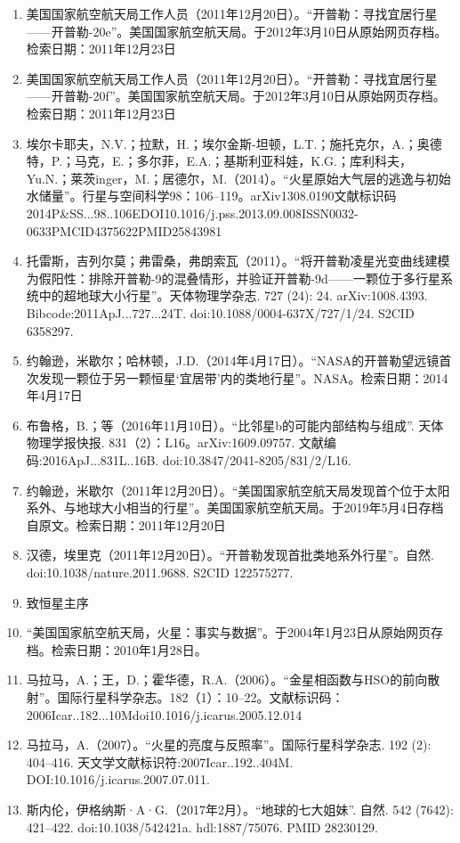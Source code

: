 \begin{enumerate}
\item 美国国家航空航天局工作人员（2011年12月20日）。“开普勒：寻找宜居行星——开普勒-20e”。美国国家航空航天局。于2012年3月10日从原始网页存档。检索日期：2011年12月23日
\item 美国国家航空航天局工作人员（2011年12月20日）。“开普勒：寻找宜居行星——开普勒-20f”。美国国家航空航天局。于2012年3月10日从原始网页存档。检索日期：2011年12月23日
\item 埃尔卡耶夫，N.V.；拉默，H.；埃尔金斯-坦顿，L.T.；施托克尔，A.；奥德特，P.；马克，E.；多尔菲，E.A.；基斯利亚科娃，K.G.；库利科夫，Yu.N.；莱茨inger，M.；居德尔，M.（2014）。“火星原始大气层的逃逸与初始水储量”。行星与空间科学98：106–119。arXiv1308.0190文献标识码2014P&SS...98..106EDOI10.1016/j.pss.2013.09.008ISSN0032-0633PMCID4375622PMID25843981
\item 托雷斯，吉列尔莫；弗雷桑，弗朗索瓦（2011）。“将开普勒凌星光变曲线建模为假阳性：排除开普勒-9的混叠情形，并验证开普勒-9d——一颗位于多行星系统中的超地球大小行星”。天体物理学杂志. 727 (24): 24. arXiv:1008.4393. Bibcode:2011ApJ...727...24T. doi:10.1088/0004-637X/727/1/24. S2CID 6358297.
\item 约翰逊，米歇尔；哈林顿，J.D.（2014年4月17日）。“NASA的开普勒望远镜首次发现一颗位于另一颗恒星‘宜居带’内的类地行星”。NASA。检索日期：2014年4月17日
\item 布鲁格，B.；等（2016年11月10日）。“比邻星b的可能内部结构与组成”. 天体物理学报快报. 831（2）：L16。arXiv:1609.09757. 文献编码:2016ApJ...831L..16B. doi:10.3847/2041-8205/831/2/L16.
\item 约翰逊，米歇尔（2011年12月20日）。“美国国家航空航天局发现首个位于太阳系外、与地球大小相当的行星”。美国国家航空航天局。于2019年5月4日存档自原文。检索日期：2011年12月20日
\item 汉德，埃里克（2011年12月20日）。“开普勒发现首批类地系外行星”。自然. doi:10.1038/nature.2011.9688. S2CID 122575277.
\item 致恒星主序
\item “美国国家航空航天局，火星：事实与数据”。于2004年1月23日从原始网页存档。检索日期：2010年1月28日。
\item 马拉马，A.；王，D.；霍华德，R.A.（2006）。“金星相函数与HSO的前向散射”。国际行星科学杂志。182（1）：10–22。文献标识码：2006Icar..182...10Mdoi10.1016/j.icarus.2005.12.014
\item 马拉马，A.（2007）。“火星的亮度与反照率”。国际行星科学杂志. 192 (2): 404–416. 天文学文献标识符:2007Icar..192..404M. DOI:10.1016/j.icarus.2007.07.011.
\item 斯内伦，伊格纳斯·A·G.（2017年2月）。“地球的七大姐妹”. 自然. 542 (7642): 421–422. doi:10.1038/542421a. hdl:1887/75076. PMID 28230129.

\end{enumerate}
